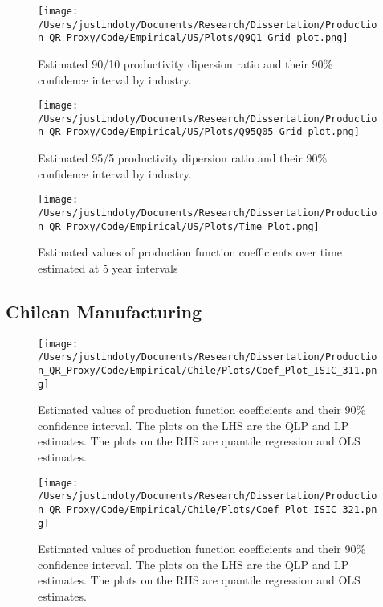 \documentclass[11pt]{article}
\begin{document}
\begin{figure}[H]
\centering
\texttt{[image: /Users/justindoty/Documents/Research/Dissertation/Production\_QR\_Proxy/Code/Empirical/US/Plots/Q9Q1\_Grid\_plot.png]}
\caption{Estimated 90/10 productivity dipersion ratio and their 90\% confidence interval by industry.}
\end{figure}

\begin{figure}[H]
\centering
\texttt{[image: /Users/justindoty/Documents/Research/Dissertation/Production\_QR\_Proxy/Code/Empirical/US/Plots/Q95Q05\_Grid\_plot.png]}
\caption{Estimated 95/5 productivity dipersion ratio and their 90\% confidence interval by industry.}
\end{figure}

\begin{figure}[H]
\centering
\texttt{[image: /Users/justindoty/Documents/Research/Dissertation/Production\_QR\_Proxy/Code/Empirical/US/Plots/Time\_Plot.png]}
\caption{Estimated values of production function coefficients over time estimated at 5 year intervals}
\end{figure}



\subsection{Chilean Manufacturing}




\begin{figure}[H]
\centering
\texttt{[image: /Users/justindoty/Documents/Research/Dissertation/Production\_QR\_Proxy/Code/Empirical/Chile/Plots/Coef\_Plot\_ISIC\_311.png]}
\caption{Estimated values of production function coefficients and their 90\% confidence interval. The plots on the LHS are the QLP and LP estimates. The plots on the RHS are quantile regression and OLS estimates.}
\end{figure}

\begin{figure}[H]
\centering
\texttt{[image: /Users/justindoty/Documents/Research/Dissertation/Production\_QR\_Proxy/Code/Empirical/Chile/Plots/Coef\_Plot\_ISIC\_321.png]}
\caption{Estimated values of production function coefficients and their 90\% confidence interval. The plots on the LHS are the QLP and LP estimates. The plots on the RHS are quantile regression and OLS estimates.}
\end{figure}
\end{document}
